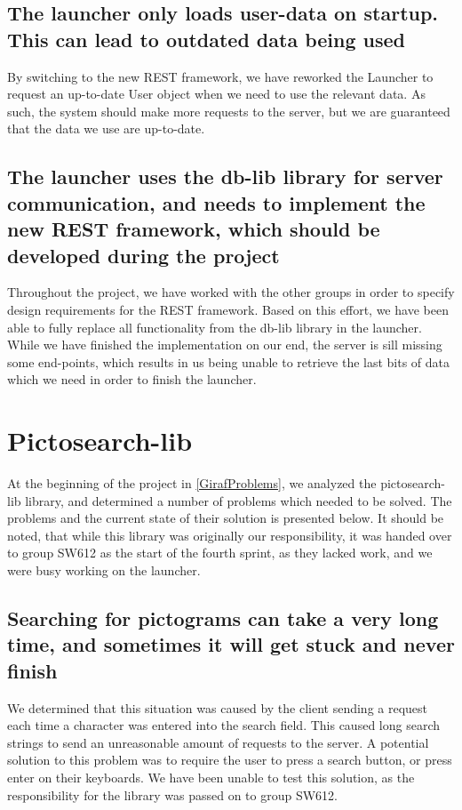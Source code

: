 \subsection*{The launcher only loads user-data on startup. This can lead to outdated data
being used}
By switching to the new REST framework, we have reworked the
Launcher to request an up-to-date User object when we need to use the relevant
data. As such, the system should make more requests to the server, but we are
guaranteed that the data we use are up-to-date.

\subsection*{The launcher uses the db-lib library for server communication, and needs to
implement the new REST framework, which should be developed during the project}
Throughout the project, we have worked with the other groups in order to
specify design requirements for the REST framework. Based on this effort, we
have been able to fully replace all functionality from the db-lib library in the
launcher. While we have finished the implementation on our end, the server is
sill missing some end-points, which results in us being unable to retrieve the
last bits of data which we need in order to finish the launcher.

\section{Pictosearch-lib}
At the beginning of the project in \autoref{GirafProblems}, we analyzed the
pictosearch-lib library, and determined a number of problems which needed to be
solved. The problems and the current state of their solution is presented
below. It should be noted, that while this library was originally our
responsibility, it was handed over to group SW612 as the start of the fourth
sprint, as they lacked work, and we were busy working on the launcher. 

\subsection*{Searching for pictograms can take a very long time, and sometimes
it will get stuck and never finish}
We determined that this situation was caused by the client sending a request
each time a character was entered into the search field. This caused long search
strings to send an unreasonable amount of requests to the server. A
potential solution to this problem was to require the user to press a search
button, or press enter on their keyboards. We have been unable to test this
solution, as the responsibility for the library was passed on to group SW612.
  
